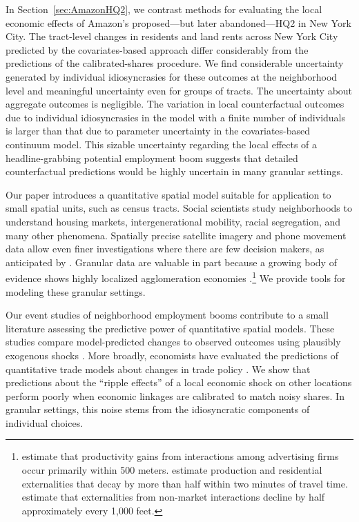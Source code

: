 \documentclass[11pt]{article}
\theoremstyle{definition}
\begin{document}
In Section~\ref{sec:AmazonHQ2}, we contrast methods for evaluating the local economic effects of Amazon's proposed---but later abandoned---HQ2 in New York City.
The tract-level changes in residents and land rents across New York City predicted by the covariates-based approach
differ considerably from the predictions of the calibrated-shares procedure.
We find considerable uncertainty generated by individual idiosyncrasies for these outcomes at the neighborhood level and meaningful uncertainty even for groups of tracts.
The uncertainty about aggregate outcomes is negligible.
The variation in local counterfactual outcomes due to individual idiosyncrasies in the model with a finite number of individuals is larger than that due to parameter uncertainty in the covariates-based continuum model.
This sizable uncertainty regarding the local effects of a headline-grabbing potential employment boom suggests that detailed counterfactual predictions would be highly uncertain in many granular settings.

Our paper introduces a quantitative spatial model suitable for application to small spatial units, such as census tracts.
Social scientists study neighborhoods to understand housing markets, intergenerational mobility, racial segregation, and many other phenomena.
Spatially precise satellite imagery \citep{DonaldsonStoreygard:2016} and phone movement data \citep{CoutureDingelGreenHandburyWilliams:2022,KreindlerMiyauchi:2023} allow even finer investigations where there are few decision makers, as anticipated by \citet[p.106]{HolmesSieg:2015}.
Granular data are valuable in part because a growing body of evidence shows highly localized agglomeration economies \citep{RosenthalStrange:2020}.\footnote{
\cite{ArzaghiHenderson:2008} estimate that productivity gains from interactions among advertising firms occur primarily within 500 meters.
\cite{AhlfeldtReddingSturmWolf:2015} estimate production and residential externalities that decay by more than half within two minutes of travel time.
\cite{RossiHansbergSarteOwens:2010} estimate that externalities from non-market interactions decline by half approximately every 1,000 feet.
}
We provide tools for modeling these granular settings.

Our event studies of neighborhood employment booms contribute to a small literature
assessing the predictive power of quantitative spatial models.
These studies compare model-predicted changes to observed outcomes using plausibly exogenous shocks
\citep{AhlfeldtReddingSturmWolf:2015,MonteReddingRossi-Hansberg:2018,AdaoArkolakisEsposito:2020}.
More broadly, economists have evaluated the predictions of quantitative trade models about changes in trade policy
\citep{Kehoe:2005,KehoePujolasRossbach:2017,AdaoCostinotDonaldson:2025}.
We show that predictions about the ``ripple effects'' of a local economic shock on other locations
perform poorly
when economic linkages are calibrated to match noisy shares.
In granular settings, this noise stems from the idiosyncratic components of individual choices.
\end{document}
